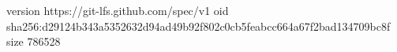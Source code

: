 version https://git-lfs.github.com/spec/v1
oid sha256:d29124b343a5352632d94ad49b92f802c0cb5feabcc664a67f2bad134709bc8f
size 786528
